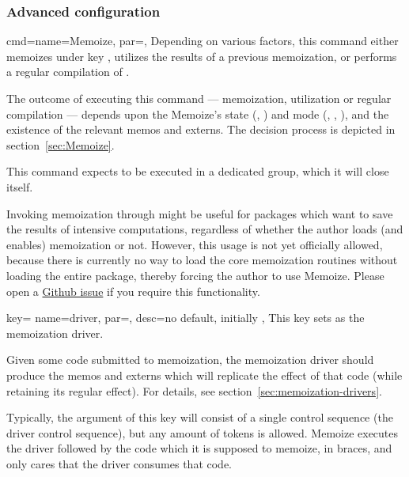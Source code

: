 \documentclass[a4paper,11pt]{article}
\begin{document}
\subsubsection{Advanced configuration}
\label{sec:ref:memoization:advanced}

\begin{doc}{
    cmd={name=Memoize, par=},
  }
  Depending on various factors, this command either memoizes  under
  key , utilizes the results of a previous memoization, or performs a
  regular compilation of .

  The outcome of executing this command --- memoization, utilization or regular
  compilation --- depends upon the Memoize's state (,
  ) and mode (, ,
  ), and the existence of the relevant memos and externs.
  The decision process is depicted in section~\ref{sec:Memoize}.

  This command expects to be executed in a dedicated group, which it will close
  itself.

  Invoking memoization through  might be useful for packages
  which want to save the results of intensive computations, regardless of
  whether the author loads (and enables) memoization or not.  However, this
  usage is not yet officially allowed, because there is currently no way to
  load the core memoization routines without loading the entire package,
  thereby forcing the author to use Memoize.  Please open a
  \href{https://github.com/sasozivanovic/memoize/issues}{Github issue} if you
  require this functionality.
\end{doc}

\begin{doc}{
    key={
      name=driver, par=,
      desc={no default, initially }
    },
  }
  This key sets  as the memoization driver.

  Given some code submitted to memoization, the memoization driver should
  produce the memos and externs which will replicate the effect of that code
  (while retaining its regular effect).  For details, see
  section~\ref{sec:memoization-drivers}.

  Typically, the  argument of this key will consist of a single
  control sequence (the driver control sequence), but any amount of tokens is
  allowed.  Memoize executes the driver followed by the code which it is
  supposed to memoize, in braces, and only cares that the driver consumes that
  code.
\end{doc}
\end{document}
